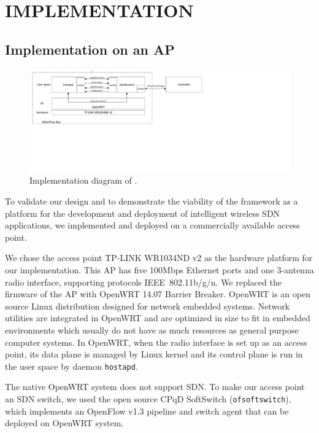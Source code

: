 \chapter{\uppercase {\aetherflowcap Implementation}}
\label{sec:impl}

\section{Implementation on an AP}

\begin{figure}[t]
\centering
\includegraphics[trim=.2in 3.75in 7in .2in, clip, width=1.0\textwidth]{figures/implementation}
\caption{Implementation diagram of \aetherflow.}
\label{fig:impl}
\end{figure}

To validate our design and to demonstrate the viability of the \aetherflow
framework as a platform for the development and deployment of intelligent
wireless SDN applications, we implemented and deployed \aetherflow on a commercially
available access point. 

We chose the access point TP-LINK WR1034ND v2 as the hardware 
platform for our implementation.  This AP has five 100Mbps Ethernet ports and one
3-antenna radio interface, supporting protocols IEEE~802.11b/g/n.  We replaced
the firmware of the AP with OpenWRT 14.07 Barrier Breaker. OpenWRT
is an open source Linux distribution designed for network embedded systems.
Network utilities are integrated in OpenWRT and are optimized in size to fit in
embedded environments which usually do not have as much resources as general
purpose computer systems. In OpenWRT, when the radio interface is set up as an
access point, its data plane is managed by Linux kernel and its control plane
is run in the user space by daemon \texttt{hostapd}. 

The native OpenWRT system does not support SDN. To make our access point an SDN
switch, we used the open source CPqD SoftSwitch (\texttt{ofsoftswitch}), which implements an OpenFlow v1.3 pipeline and switch
agent that can be deployed on OpenWRT system.

